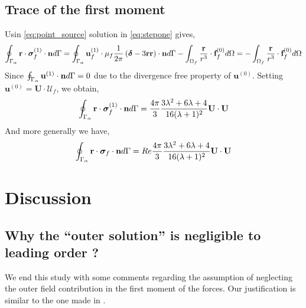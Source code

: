 \subsection{Trace of the first moment}


Usin \ref{eq:point_source} solution in \ref{eq:stepone} gives, 
\begin{align*}
    \oint_{\Gamma_{\alpha}}  \textbf{r}\cdot  \bm\sigma_f^{(1)} \cdot \textbf{n} d\Gamma
    = 
    \oint_{\Gamma_{\alpha}} \textbf{u}_f^{(1)} \cdot  \mu_f \frac{1}{2\pi}\left(
        \bm\delta
        - 3 \textbf{rr}
    \right) \cdot \textbf{n} d\Gamma
    - \int_{\Omega_f}  \frac{\textbf{r}}{r^3}\cdot  \textbf{f}^{(0)}_f d\Omega
    = 
    - \int_{\Omega_f}  \frac{\textbf{r}}{r^3}\cdot  \textbf{f}^{(0)}_f d\Omega
\end{align*}
Since $\oint_{\Gamma_{\alpha}} \textbf{u}^{(1)} \cdot \textbf{n} d\Gamma =0$ due to the divergence free property of $\textbf{u}^{(0)}$. 
Setting $\textbf{u}^{(0)} = \textbf{U}\cdot \mathcal{U}_f$, we obtain, 
\begin{equation}
    \oint_{\Gamma_{\alpha}}  \textbf{r}\cdot  \bm\sigma_f^{(1)} \cdot \textbf{n} d\Gamma
    = \frac{4\pi}{3} \frac{3\lambda^2 + 6\lambda + 4}{16(\lambda +1 )^2} \textbf{U} \cdot \textbf{U}
\end{equation}
And more generally we have, 
\begin{equation}
    \intS{ \textbf{r}\cdot  \bm\sigma_f \cdot \textbf{n}}
    = Re \frac{4\pi}{3} \frac{3\lambda^2 + 6\lambda + 4}{16(\lambda +1 )^2} \textbf{U} \cdot \textbf{U}
    \label{eq:sol2} 
\end{equation}

\section{Discussion}
\subsection{Why the ``outer solution'' is negligible to leading order ?}

We end this study with some comments regarding the assumption of neglecting the outer field contribution in the first moment of the forces.
Our justification is similar to the one made in \citet{stone2001inertial,dabade2015}.  

